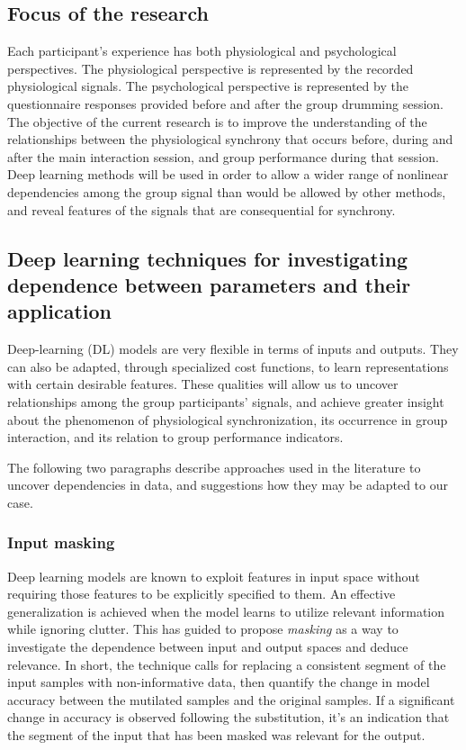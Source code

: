 \documentclass[a4paper, 11pt]{report}      %
\begin{document}
\subsection{Focus of the research}
Each participant's experience has both physiological and psychological perspectives. The physiological perspective is represented by the recorded physiological signals. The psychological perspective is represented by the questionnaire responses provided before and after the group drumming session. The objective of the current research is to improve the understanding of the relationships between the physiological synchrony that occurs before, during and after the main interaction session, and group performance during that session. Deep learning methods will be used in order to allow a wider range of nonlinear dependencies among the group signal than would be allowed by other methods,
and reveal features of the signals that are consequential for synchrony.



\subsection{Deep learning techniques for investigating dependence between parameters and their application}

Deep-learning (DL) models are very flexible in terms of inputs and outputs. They can also be adapted, through specialized cost functions, to learn representations with certain desirable features. These qualities will allow us to uncover relationships among the group participants' signals, and achieve greater insight about the phenomenon of physiological synchronization, its occurrence in group interaction, and its relation to group performance indicators.

The following two paragraphs describe approaches used in the literature to uncover dependencies in data, and suggestions how they may be adapted to our case.

\subsubsection{Input masking}
Deep learning models are known to exploit features in input space without requiring those features to be explicitly specified to them. An effective generalization is achieved when the model learns to utilize relevant information while ignoring clutter. This has guided \cite{williams2019demystifying} to propose \emph{masking} as a way to investigate the dependence between input and output spaces and deduce relevance. In short, the technique calls for replacing a consistent segment of the input samples with non-informative data, then quantify the change in model accuracy between the mutilated samples and the original samples. If a significant change in accuracy is observed following the substitution, it's an indication that the segment of the input that has been masked was relevant for the output.
\end{document}
